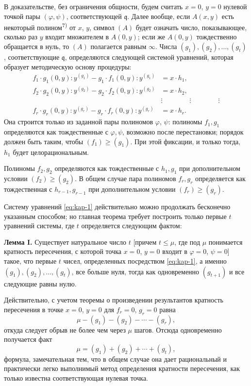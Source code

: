 \documentclass[11pt]{article}
\theoremstyle{plain}
\begin{document}
В доказательстве, без ограничения общности, будем считать $x = 0$,
$y = 0$ нулевой точкой пары $(\varphi, \psi)$, соответствующей
$\mathfrak{q}$. Далее вообще, если $A(x,y)$ есть некоторый
полином\textsuperscript{7)} от $x$, $y$, символ $(A)$ будет означать
число, показывающее, сколько раз $y$ входит множителем в $A(0,y)$;
если же $A(0,y)$ тождественно обращается в нуль, то $(A)$ полагается
равным $\infty$. Числа $(g_{1}), (g_{2}), \ldots, (g_{t})$,
соответствующие $\mathfrak{q}$, определяются следующей системой
уравнений, которая образует методическую основу процедуры:
\begin{equation}\label{eq:kap-1}
\begin{aligned}
f_{1}\cdot g_{1}(0,y):y^{(g_{1})} - g_{1}\cdot f_{1}(0,y):y^{(g_{1})} &= x\cdot h_{1},\\
f_{2}\cdot g_{2}(0,y):y^{(g_{2})} - g_{2}\cdot f_{2}(0,y):y^{(g_{2})} &= x\cdot h_{2},\\
&\vdots \qquad\qquad\vdots\qquad\qquad\vdots\\
f_{r}\cdot g_{r}(0,y):y^{(g_{r})} - g_{r}\cdot f_{r}(0,y):y^{(g_{r})} &= x\cdot h_{r}.
\end{aligned}
\end{equation}
Она строится только из заданной пары полиномов $\varphi$, $\psi$:
полиномы $f_{1}, g_{1}$ определяются как тождественные с
$\varphi, \psi$, возможно после перестановки; порядок должен быть
таким, чтобы $(f_{1}) \geq (g_{1})$. При этой фиксации, и только
тогда, $h_{1}$ будет целорациональным.

Полиномы $f_{2}, g_{2}$ определяются как тождественные с
$h_{1}, g_{1}$ при дополнительном условии
$(f_{2}) \geq (g_{2})$. В общем случае пара полиномов
$f_{r}, g_{r}$ определяется как тождественная с $h_{r-1}, g_{r-1}$
при дополнительном условии $(f_{r}) \geq (g_{r})$.

Систему уравнений \eqref{eq:kap-1} действительно можно продолжать
бесконечно указанным способом; но главная теорема требует построить
только первые $t$ уравнений системы, где $t$ определяется следующим
фактом:

\smallskip
\textbf{Лемма I.} Существует натуральное число $t$ [причем
$t \leq \mu$, где под $\mu$ понимается кратность пересечения, с
которой точка $x = 0$, $y = 0$ входит в $\varphi = 0$, $\psi = 0$]
такое, что первые $t$ чисел, определенных посредством
\eqref{eq:kap-1}, а именно $(g_{1}), (g_{2}), \ldots, (g_{t})$, все
больше нуля, тогда как одновременно $(g_{t+1})$ и все следующие
равны нулю.

Действительно, с учетом теоремы о произведении результантов кратность
пересечения в точке $x = 0$, $y = 0$ для $f_{r} = 0$, $g_{r} = 0$
равна
\[
\mu - (g_{1}) - (g_{2}) - \cdots - (g_{r}),
\]
откуда следует обрыв не более чем через $\mu$ шагов. Отсюда
одновременно получается факт
\begin{equation}\label{eq:kap-2}
\mu = (g_{1}) + (g_{2}) + \cdots + (g_{t}),
\end{equation}
формула, замечательная тем, что в общем случае она дает рациональный
и практически легко выполнимый метод определения кратности
пересечения, как только известна соответствующая нулевая точка.
\end{document}
